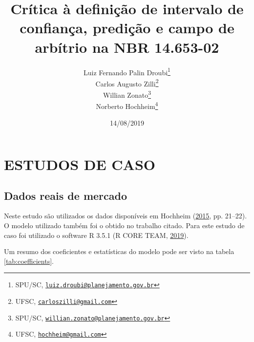 \documentclass[a4paper, 12pt]{article}
\title{Crítica à definição de intervalo de confiança, predição e campo de
arbítrio na NBR 14.653-02}
\author{Luiz Fernando Palin Droubi\footnote{SPU/SC,
  \href{mailto:luiz.droubi@planejamento.gov.br}{\nolinkurl{luiz.droubi@planejamento.gov.br}}} \\ Carlos Augusto Zilli\footnote{UFSC,
  \href{mailto:carloszilli@gmail.com}{\nolinkurl{carloszilli@gmail.com}}} \\ Willian Zonato\footnote{SPU/SC,
  \href{mailto:willian.zonato@planejamento.gov.br}{\nolinkurl{willian.zonato@planejamento.gov.br}}} \\ Norberto Hochheim\footnote{UFSC,
  \href{mailto:hochheim@gmail.com}{\nolinkurl{hochheim@gmail.com}}}}
\date{14/08/2019}
\begin{document}
\maketitle

\hypertarget{estudos-de-caso}{%
\section{ESTUDOS DE CASO}\label{estudos-de-caso}}

\hypertarget{dados-reais-de-mercado}{%
\subsection{Dados reais de mercado}\label{dados-reais-de-mercado}}

Neste estudo são utilizados os dados disponíveis em Hochheim
(\protect\hyperlink{ref-hochheim}{2015}, pp. 21--22). O modelo utilizado
também foi o obtido no trabalho citado. Para este estudo de caso foi
utilizado o software R 3.5.1 (R CORE TEAM,
\protect\hyperlink{ref-R}{2019}).

\begin{table}[t]

\caption{\label{tab:coefficients}Coeficientes e estatísticas do modelo adotado.}
\centering
{}
\end{table}

Um resumo dos coeficientes e estatísticas do modelo pode ser visto na
tabela \ref{tab:coefficients}.
\end{document}
